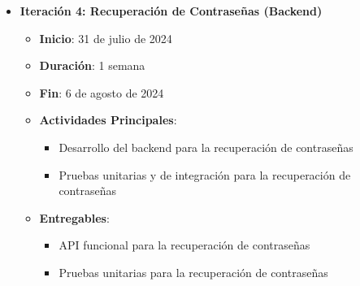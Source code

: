 \documentclass{article}
\begin{document}
\begin{itemize}
\begin{itemize}
              \item \textbf{Iteración 4: Recuperación de Contraseñas (Backend)}
                    \begin{itemize}
                        \item \textbf{Inicio}: 31 de julio de 2024
                        \item \textbf{Duración}: 1 semana
                        \item \textbf{Fin}: 6 de agosto de 2024
                        \item \textbf{Actividades Principales}:
                              \begin{itemize}
                                  \item Desarrollo del backend para la recuperación de contraseñas
                                  \item Pruebas unitarias y de integración para la recuperación de contraseñas
                              \end{itemize}
                        \item \textbf{Entregables}:
                              \begin{itemize}
                                  \item API funcional para la recuperación de contraseñas
                                  \item Pruebas unitarias para la recuperación de contraseñas
                              \end{itemize}
                    \end{itemize}


\end{itemize}
\end{itemize}
\end{document}
